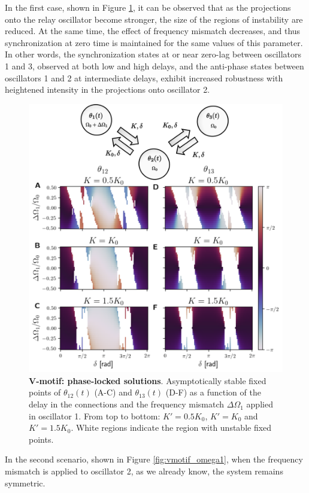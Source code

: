 \documentclass[../main.tex]{subfiles}
\begin{document}
In the first case, shown in Figure \ref{fig:vmotif_omega0}, it can be observed that as the projections onto the relay oscillator become stronger, the size of the regions of instability are reduced.
At the same time, the effect of frequency mismatch decreases, and thus synchronization at zero time is maintained for the same values of this parameter.
In other words, the synchronization states at or near zero-lag between oscillators 1 and 3, observed at both low and high delays, and the anti-phase states between oscillators 1 and 2 at intermediate delays, exhibit increased robustness with heightened intensity in the projections onto oscillator 2.
\begin{figure}[!htb]
    \centering
    \includegraphics[width=\textwidth]{chapter2/figures/vmotif_different_omega_0_edited.png}
    \caption{\textbf{V-motif: phase-locked solutions}.
    Asymptotically stable fixed points of $\theta_{12}(t)$ (A-C) and $\theta_{13}(t)$ (D-F) as a function of the delay in the connections and the frequency mismatch $\Delta\Omega_1$ applied in oscillator 1.
    From top to bottom: $K'=0.5K_0$, $K'=K_0$ and $K'=1.5K_0$.
    White regions indicate the region with unstable fixed points.}
    \label{fig:vmotif_omega0}
\end{figure}
In the second scenario, shown in Figure \ref{fig:vmotif_omega1}, when the frequency mismatch is applied to oscillator 2, as we already know, the system remains symmetric.
\end{document}
